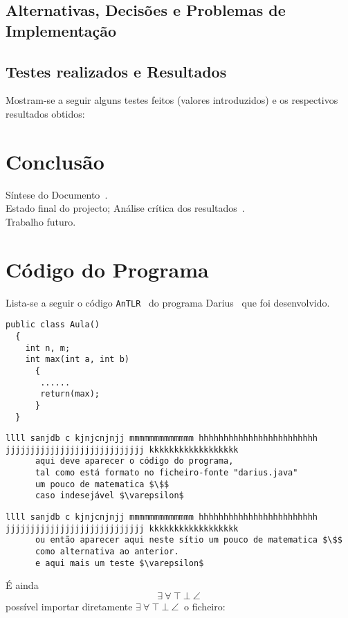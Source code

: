 \documentclass{report}
\def\darius{\textsf{Darius}\xspace}
\def\antlr{\texttt{AnTLR}\xspace}
\begin{document}
\section{Alternativas, Decisões e Problemas de Implementação}
\section{Testes realizados e Resultados}
Mostram-se a seguir alguns testes feitos (valores introduzidos) e
os respectivos resultados obtidos:



\chapter{Conclusão} \label{concl}
Síntese do Documento~\cite{Martini2016a,Hoare73a}.\\
Estado final do projecto; Análise crítica dos resultados~\cite{Sto77a}.\\
Trabalho futuro.

\appendix
\chapter{Código do Programa}

Lista-se a seguir o código \antlr~\cite{Par05} do programa \darius~\cite{NPH2016a} que foi desenvolvido.
\begin{verbatim}
public class Aula()
  {
    int n, m;
    int max(int a, int b)
      {
       ......
       return(max);
      }
  }
\end{verbatim}

\begin{verbatim}
llll sanjdb c kjnjcnjnjj mmmmmmmmmmmmm hhhhhhhhhhhhhhhhhhhhhhhh jjjjjjjjjjjjjjjjjjjjjjjjjjjj kkkkkkkkkkkkkkkkkk
      aqui deve aparecer o código do programa,
      tal como está formato no ficheiro-fonte "darius.java"
      um pouco de matematica $\$$
      caso indesejável $\varepsilon$
\end{verbatim}

\begin{lstlisting}[caption={Exemplo de uma Listagem}, label={lstExe1}]
llll sanjdb c kjnjcnjnjj mmmmmmmmmmmmm hhhhhhhhhhhhhhhhhhhhhhhh jjjjjjjjjjjjjjjjjjjjjjjjjjjj kkkkkkkkkkkkkkkkkk
      ou então aparecer aqui neste sítio um pouco de matematica $\$$
      como alternativa ao anterior.
      e aqui mais um teste $\varepsilon$
\end{lstlisting}



É ainda \[  \exists \   \forall\  \top\  \bot\   \angle\ \] possível importar diretamente $ \exists \   \forall\  \top\  \bot\   \angle\ $ o ficheiro:


%
%


\end{document}
